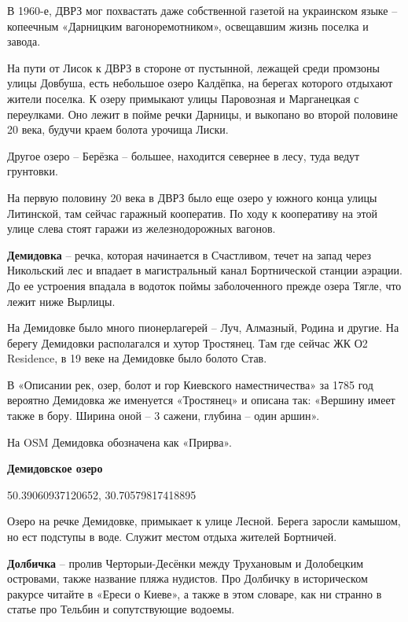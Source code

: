 В 1960-е, ДВРЗ мог похвастать даже собственной газетой на украинском языке – копеечным «Дарницким вагоноремотником», освещавшим жизнь поселка и завода.

На пути от Лисок к ДВРЗ в стороне от пустынной, лежащей среди промзоны улицы Довбуша, есть небольшое озеро Калдёпка, на берегах которого отдыхают жители поселка. К озеру примыкают улицы Паровозная и Марганецкая с переулками. Оно лежит в пойме речки Дарницы, и выкопано во второй половине 20 века, будучи краем болота урочища Лиски.

Другое озеро – Берёзка – большее, находится севернее в лесу, туда ведут грунтовки.

На первую половину 20 века в ДВРЗ было еще озеро у южного конца улицы Литинской, там сейчас гаражный кооператив. По ходу к кооперативу на этой улице слева стоят гаражи из железнодорожных вагонов.\\

\medskip

\textbf{Демидовка} – речка, которая начинается в Счастливом, течет на запад через Никольский лес и впадает в магистральный канал Бортнической станции аэрации. До ее устроения впадала в водоток поймы заболоченного прежде озера Тягле, что лежит ниже Вырлицы.

На Демидовке было много пионерлагерей – Луч, Алмазный, Родина и другие. На берегу Демидовки располагался и хутор Тростянец. Там где сейчас ЖК О2 Residence, в 19 веке на Демидовке было болото Став.

В «Описании рек, озер, болот и гор Киевского наместничества» за 1785 год вероятно Демидовка же именуется «Тростянец» и описана так: «Вершину имеет также в бору. Ширина оной – 3 сажени, глубина – один аршин».

На OSM Демидовка обозначена как «Прирва».\\

\medskip

\textbf{Демидовское озеро}

50.39060937120652, 30.70579817418895

Озеро на речке Демидовке, примыкает к улице Лесной. Берега заросли камышом, но ест подступы в воде. Служит местом отдыха жителей Бортничей.\\

\medskip

\textbf{Долбичка} – пролив Черторыи-Десёнки между Трухановым и Долобецким островами, также название пляжа нудистов. Про Долбичку в историческом ракурсе читайте в «Ереси о Киеве», а также в этом словаре, как ни странно в статье про Тельбин и сопутствующие водоемы.\\

